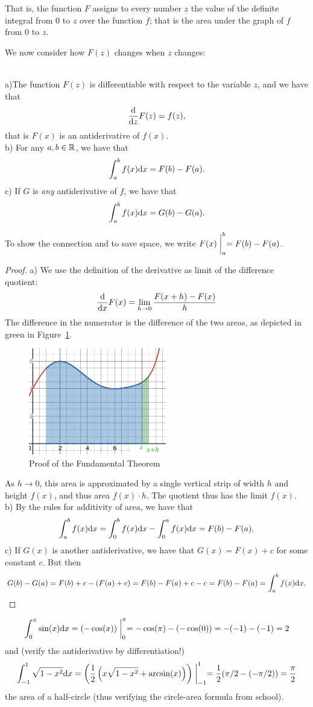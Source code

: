 That is, the function $F$ assigns to every number $z$ the value of the definite
integral from $0$ to $z$ over the function $f$; that is the area under the graph
of $f$ from $0$ to $z$.

We now consider how $F(z)$ changes when $z$ changes:
\begin{thm}\ \\
a)The function $F(z)$ is differentiable with respect to the variable $z$, and we
have that
\[
\frac{{\mbox{d}}}{{\mbox{d}}z} F(z)=f(z),
\]
that is $F(x)$ is an antiderivative of $f(x)$.\\
b) For any $a,b\in{\mathbb R}$, we have that 
\[
\int_a^b f(x){\mbox{d}}x=F(b)-F(a).
\]
c) If $G$ is {\em any} antiderivative of $f$, we have that
\[
\int_a^b f(x){\mbox{d}}x=G(b)-G(a).
\]
\end{thm}
To show the connection and to save space, we write $\displaystyle
F(x)\biggm|_a^b=F(b)-F(a)$.
\begin{proof}
a) We use the definition of the derivative as limit of the difference quotient:
\[
\frac{{\mbox{d}}}{{\mbox{d}}x} F(x)=\lim_{h\to 0}\frac{F(x+h)-F(x)}{h}
\]
The difference in the numerator is the difference of the two areas, as depicted in
green in Figure~\ref{figfundthm}. 
\begin{figure}
\begin{center}
\includegraphics[width=6cm]{pic/fundthm.png}
\end{center}
\caption{Proof of the Fundamental Theorem}
\label{figfundthm}
\end{figure}
As $h\to 0$, this area is approximated by a single vertical strip of width $h$ and
height $f(x)$, and thus area $f(x)\cdot h$. The quotient thus has the limit
$f(x)$.\\
b) By the rules for additivity of area, we have that
\[
\int_a^b f(x){\mbox{d}}x=\int_0^b f(x){\mbox{d}}x-\int_0^a f(x){\mbox{d}}x=F(b)-F(a).
\]
c) If $G(x)$ is another antiderivative, we have that $G(x)=F(x)+c$ for some
constant $c$. But then
\[
G(b)-G(a)=F(b)+c-(F(a)+c)=F(b)-F(a)+c-c=F(b)-F(a)=\int_a^b f(x){\mbox{d}}x.
\]
\end{proof}
\begin{bsp}
\[
\int_0^\pi
\sin(x){\mbox{d}}x=(-\cos(x))\biggm|_0^\pi=-\cos(\pi)-(-\cos(0))=-(-1)-(-1)=2
\]
and (verify the antiderivative by differentiation!)
\[
\int_{-1}^1\sqrt{1-x^2}{\mbox{d}}x=\left(\frac12\left(x\sqrt{1-x^2}+\arcsin(x)\right)\right)
\biggm|_{-1}^1=\frac12(\pi/2-(-\pi/2))=\frac{\pi}{2}
\]
the area of a half-circle (thus verifying the circle-area formula from school).
\end{bsp}

